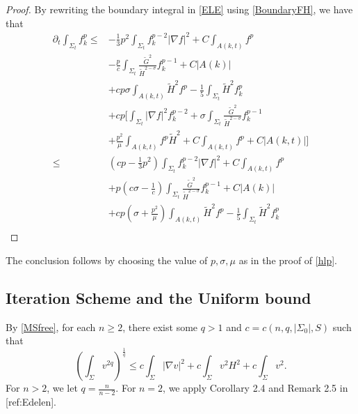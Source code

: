 \begin{proof}
    By rewriting the boundary integral in \autoref{ELE} using \autoref{BoundaryFH}, we have that
    \begin{equation*}
        \begin{split}
            \partial_t \int_{\Sigma_t} f_k^p
        \leq &  -\frac{1}{3}p^2 \int_{\Sigma_t} f_{k}^{p-2}\left| \nabla f \right| ^2+C \int_{A(k,t)} f^p  \\
        &-\frac{p}{c} \int_{\Sigma_t} \frac{\tilde{G}^2}{\tilde{H}^{2-\sigma }}f_{k}^{p-1}+C \left| A(k) \right|\\
        &+cp \sigma \int_{A(k,t)}^{}\tilde{H}^2f^p-\frac{1}{5}\int_{\Sigma_t} \tilde{H}^2f_{k}^{p} \\
        &+cp \bigg[  \int_{\Sigma_t} \left| \nabla f \right| ^2 f_{k}^{p-2} + \sigma \int_{\Sigma_t} \frac{\tilde{G}^{2} }{\tilde{H}^{2-\sigma } } f_{k}^{p-1} \\
        &+ \frac{p^2}{\mu }\int_{A(k,t)}^{}f^p \tilde{H}^{2} + C \int_{A(k,t)}^{}f^p + C \left| A(k,t) \right|\bigg]\\
        \leq & \left( cp-\frac{1}{3}p^2 \right) \int_{\Sigma_t} f_{k}^{p-2}\left| \nabla f \right| ^2+C \int_{A(k,t)} f^p  \\
        &+ p\left( c\sigma - \frac{1}{c} \right) \int_{\Sigma_t} \frac{\tilde{G}^2}{\tilde{H}^{2-\sigma }}f_{k}^{p-1}+C \left| A(k) \right|\\
        &+ cp\left(  \sigma + \frac{p^2}{\mu } \right) \int_{A(k,t)}^{}\tilde{H}^2f^p-\frac{1}{5}\int_{\Sigma_t} \tilde{H}^2f_{k}^{p}\\
        \end{split}
        \end{equation*}
\end{proof}
The conclusion follows by choosing the value of $p,\sigma ,\mu $ as in the proof of \autoref{hlp}. 

\subsection{Iteration Scheme and the Uniform bound}

By \autoref{MSfree}, for each $n \geq 2$, there exist some $q>1$ and $c=c(n,q,\left| \Sigma_0 \right|,S )$ such that
\[\left( \int_{\Sigma} v^{2q} \right) ^{\frac{1}{q}} \leq c \int_{\Sigma} \left| \nabla v \right| ^2 + c \int_{\Sigma} v^2 H^2 + c \int_{\Sigma} v^2.\]
For $n>2$, we let $q=\frac{n}{n-2}$. For $n=2$, we apply Corollary 2.4 and Remark 2.5 in [ref:Edelen].

